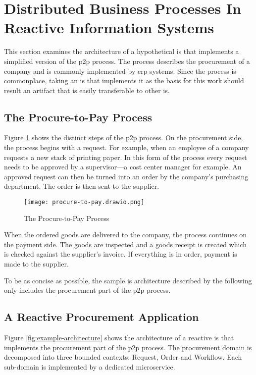 \clearpage
\section{Distributed Business Processes In Reactive Information Systems}\label{sec:problem}

This section examines the architecture of a hypothetical \gls{is} that implements a simplified version of the \gls{p2p} process.
The process describes the procurement of a company and is commonly implemented by \gls{erp} systems.
Since the process is commonplace, taking an \gls{is} that implements it as the basis for this work should result an artifact that is easily transferable to other \gls{is}.

\subsection{The Procure-to-Pay Process}

Figure \ref{fig:procure-to-pay} shows the distinct steps of the \gls{p2p} process.
On the procurement side, the process begins with a request.
For example, when an employee of a company requests a new stack of printing paper.
In this form of the process every request needs to be approved by a supervisor---a cost center manager for example.
An approved request can then be turned into an order by the company's purchasing department.
The order is then sent to the supplier.

\begin{figure}[h]
  \centering
  \texttt{[image: procure-to-pay.drawio.png]}
  \caption{The Procure-to-Pay Process}\label{fig:procure-to-pay}
\end{figure}

When the ordered goods are delivered to the company, the process continues on the payment side.
The goods are inspected and a goods receipt is created which is checked against the supplier's invoice.
If everything is in order, payment is made to the supplier.

To be as concise as possible, the sample \gls{is} architecture described by the following only includes the procurement part of the \gls{p2p} process.

\subsection{A Reactive Procurement Application}

Figure \ref{fig:example-architecture} shows the architecture of a reactive \gls{is} that implements the procurement part of the \gls{p2p} process.
The procurement domain is decomposed into three bounded contexts: Request, Order and Workflow.
Each sub-domain is implemented by a dedicated microservice.

